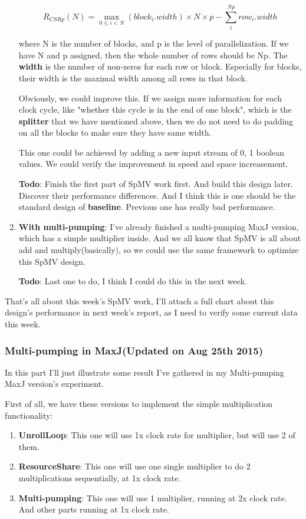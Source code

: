 \begin{enumerate}
\[ R_{CSRp}(N) = 
	\max_{0 \leq i < N}(block_i.width)\times N \times p - 
	\sum_{i}^{Np} row_i.width 
\]

where N is the number of blocks, and p is the level of parallelization. If we have N and p assigned, then the whole number of rows should be Np. The \textbf{width} is the number of non-zeros for each row or block. Especially for blocks, their width is the maximal width among all rows in that block.

Obviously, we could improve this. If we assign more information for each clock cycle, like "whether this cycle is in the end of one block", which is the \textbf{splitter} that we have mentioned above, then we do not need to do padding on all the blocks to make sure they have same width.

This one could be achieved by adding a new input stream of 0, 1 boolean values. We could verify the improvement in speed and space increasement.

\textbf{Todo}: Finish the first part of SpMV work first. And build this design later. Discover their performance differences. And I think this is one should be the standard design of \textbf{baseline}. Previous one has really bad performance.

\item
\textbf{With multi-pumping}: I've already finished a multi-pumping MaxJ version, which has a simple multiplier inside. And we all know that SpMV is all about add and multiply(basically), so we could use the same framework to optimize this SpMV design.

\textbf{Todo}: Last one to do, I think I could do this in the next week.
\end{enumerate}

That's all about this week's SpMV work, I'll attach a full chart about this design's performance in next week's report, as I need to verify some current data this week.

\subsubsection{Multi-pumping in MaxJ(Updated on Aug 25th 2015)}

In this part I'll just illustrate some result I've gathered in my Multi-pumping MaxJ version's experiment. 

First of all, we have these versions to implement the simple multiplication functionality:
\begin{enumerate}
\item \textbf{UnrollLoop}: This one will use 1x clock rate for multiplier, but will use 2 of them.
\item \textbf{ResourceShare}: This one will use one single multiplier to do 2 multiplications sequentially, at 1x clock rate.
\item \textbf{Multi-pumping}: This one will use 1 multiplier, running at 2x clock rate. And other parts running at 1x clock rate. 
\end{enumerate}

